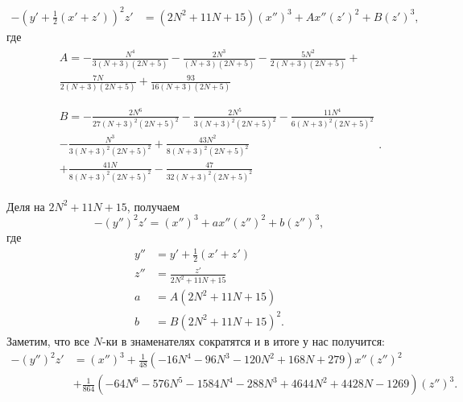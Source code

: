 \begin{itemize}[leftmargin=0.6cm]
\begin{align*}
        -\left( y' + \frac{1}{2}(x' + z')  \right)^2 z' &= \left(2 N^2 + 11 N
        + 15\right) \left( x'' \right)^3 + A x'' \left( z' \right)^2 + B
        \left( z' \right)^3        
    ,\end{align*}
    где
    \begin{align*}
        &&\begin{split}
            A =   
            - \frac{N^4}{3 (N + 3) (2 N + 5)} - \frac{2
            N^3}{(N + 3) (2 N + 5)} - \frac{5 N^2}{2 (N + 3) (2 N + 5)} + \\
            \frac{7 N}{2 (N + 3) (2 N + 5)} + \frac{93}{16 (N + 3) (2 N +
            5)} 
        \end{split} \\ \\
        &&\begin{split}
            B =   - \frac{2 N^6}{27 (N + 3)^2 (2 N + 5)^2} -
            \frac{2 N^5}{3 (N + 3)^2 (2 N + 5)^2} - \frac{11 N^4}{6 (N + 3)^2 (2
            N + 5)^2} \\ - \frac{N^3}{3 (N + 3)^2 (2 N + 5)^2} + \frac{43 N^2}{8 (N
            + 3)^2 (2 N + 5)^2} \\ + \frac{41 N}{8 (N + 3)^2 (2 N + 5)^2} -
            \frac{47}{32 (N + 3)^2 (2 N + 5)^2}
        \end{split}
    .\end{align*}

    Деля на \(2 N^2 + 11 N + 15\), получаем
    \[
    -\left( y'' \right)^2 z' = (x'')^3 + a x'' \left( z'' \right)^2 + b \left(
    z'' \right)^3
    ,\] 
    где
    \begin{align*}
        y'' &=  y' + \frac{1}{2}(x' + z') \\
        z'' &= \frac{z'}{2 N^2 + 11 N + 15} \\
        a &= A \left( 2 N^2 + 11 N + 15 \right)\\
        b &= B \left( 2 N^2 + 11 N + 15 \right)^2
    .\end{align*}
    Заметим, что все \(N\)-ки в знаменателях сократятся и в итоге у нас
    получится:
    \begin{align*}
        -\left( y'' \right)^2 z' &= \left( x'' \right)^3  +  \frac{1}{48}
        \left(-16 N^4 - 96 N^3 - 120 N^2 + 168 N + 279\right) x'' \left( z''
        \right)^2 \\ 
        &+ \frac{1}{864} \left(-64 N^6 - 576 N^5 - 1584 N^4 - 288 N^3
        + 4644 N^2 + 4428 N - 1269\right) \left( z'' \right)^3
    .\end{align*}


\end{itemize}
